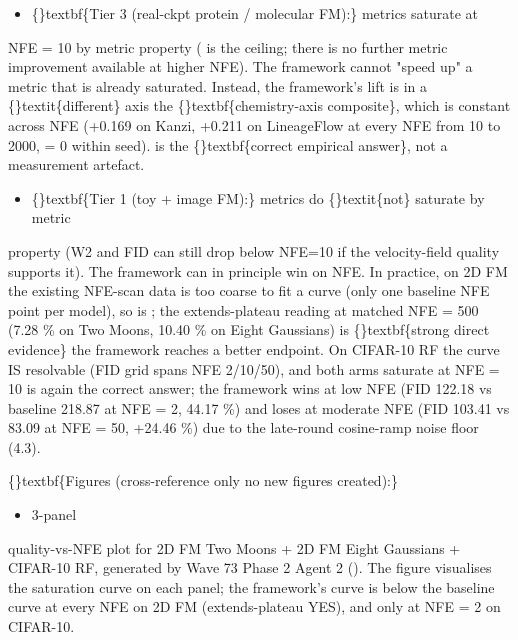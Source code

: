 \documentclass{article}
\begin{document}
\begin{itemize}
\item \{\}textbf\{Tier 3 (real-ckpt protein / molecular FM):\} metrics saturate at
\end{itemize}
NFE = 10 by metric property ( is the ceiling; there is no further metric improvement available at higher NFE). The framework cannot "speed up" a metric that is already saturated. Instead, the framework's lift is in a \{\}textit\{different\} axis  the \{\}textbf\{chemistry-axis composite\}, which is constant across NFE (+0.169 on Kanzi, +0.211 on LineageFlow at every NFE from 10 to 2000,  = 0 within seed).  is the \{\}textbf\{correct empirical answer\}, not a measurement artefact.

\begin{itemize}
\item \{\}textbf\{Tier 1 (toy + image FM):\} metrics do \{\}textit\{not\} saturate by metric
\end{itemize}
property (W2 and FID can still drop below NFE=10 if the velocity-field quality supports it). The framework can in principle win on NFE. In practice, on 2D FM the existing NFE-scan data is too coarse to fit a curve (only one baseline NFE point per model), so  is ; the extends-plateau reading at matched NFE = 500 (7.28 \% on Two Moons, 10.40 \% on Eight Gaussians) is \{\}textbf\{strong direct evidence\} the framework reaches a better endpoint. On CIFAR-10 RF the curve IS resolvable (FID grid spans NFE 2/10/50), and both arms saturate at NFE = 10   is again the correct answer; the framework wins at low NFE (FID 122.18 vs baseline 218.87 at NFE = 2, 44.17 \%) and loses at moderate NFE (FID 103.41 vs 83.09 at NFE = 50, +24.46 \%) due to the late-round  cosine-ramp noise floor (4.3).

\{\}textbf\{Figures (cross-reference only  no new figures created):\}

\begin{itemize}
\item {}  3-panel
\end{itemize}
quality-vs-NFE plot for 2D FM Two Moons + 2D FM Eight Gaussians + CIFAR-10 RF, generated by Wave 73 Phase 2 Agent 2 (). The figure visualises the saturation curve on each panel; the framework's curve is below the baseline curve at every NFE on 2D FM (extends-plateau YES), and only at NFE = 2 on CIFAR-10.
\end{document}
